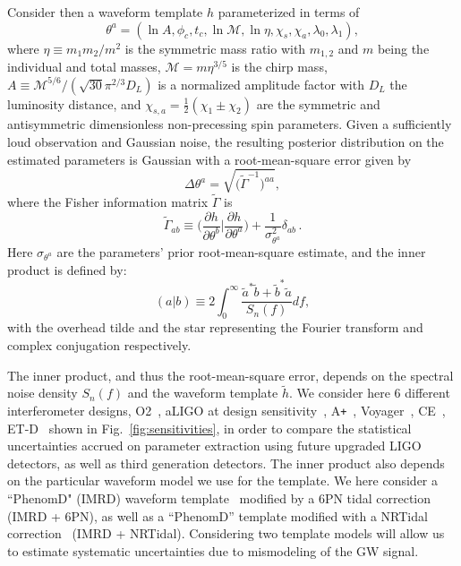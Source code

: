 \documentclass[prd,twocolumn,nofootinbib,superscriptaddress,amsmath,amssymb]{revtex4-1}
\begin{document}
Consider then a waveform template $h$ parameterized in terms of
\begin{equation}\label{eq:template}
\theta^a=(\ln{A},\phi_c,t_c,\ln{\mathcal{M}},\ln{\mathcal{\eta}},\chi_s,\chi_a,\lambda_0, \lambda_1),
\end{equation}
where $\eta \equiv m_1 m_2/m^2$ is the symmetric mass ratio with $m_{1,2}$ and $m$ being the individual and total masses, $\mathcal{M}=m \eta^{3/5}$ is the chirp mass, $A \equiv {\mathcal{M}^{5/6}}/({\sqrt{30}\pi^{2/3}D_L})$ is a normalized amplitude factor with $D_L$ the luminosity distance, and $\chi_{s,a}=\frac{1}{2}(\chi_1\pm\chi_2)$ are the symmetric and antisymmetric dimensionless non-precessing spin parameters. Given a sufficiently loud observation and Gaussian noise, the resulting posterior distribution on the estimated parameters is Gaussian with a root-mean-square error given by
\begin{equation}
\Delta \theta^a=\sqrt{\Big( \tilde{\Gamma}^{-1}\Big)^{aa}},
\end{equation}
where the Fisher information matrix $\tilde{\Gamma}$ is
\begin{equation}
\tilde{\Gamma}_{ab} \equiv \Big( \frac{\partial h}{\partial \theta^b} \Big| \frac{\partial h}{\partial \theta^a}\Big) + \frac{1}{\sigma_{\theta^a}^2} \delta_{ab}\,.
\end{equation}
Here $\sigma_{\theta^a}$ are the parameters' prior root-mean-square estimate, and the inner product is defined by:
\begin{equation}
(a|b) \equiv 2 \int^{\infty}_0\frac{\tilde{a}^*\tilde{b}+\tilde{b}^*\tilde{a}}{S_n(f)}df,
\end{equation}
with the overhead tilde and the star representing the Fourier transform and complex conjugation respectively. 

The inner product, and thus the root-mean-square error, depends on the spectral noise density $S_{n}(f)$ and the waveform template $\tilde{h}$. We consider here 6 different interferometer designs, O2~\cite{aLIGO}, aLIGO at design sensitivity~\cite{aLIGO}, A\texttt{+}~\cite{Ap_Voyager_CE}, Voyager~\cite{Ap_Voyager_CE}, CE~\cite{ET}, ET-D~\cite{Ap_Voyager_CE} shown in Fig.~\ref{fig:sensitivities}, in order to compare the statistical uncertainties accrued on parameter extraction using future upgraded LIGO detectors, as well as third generation detectors. The inner product also depends on the particular waveform model we use for the template. We here consider a ``PhenomD" (IMRD) waveform template~\cite{PhenomDI,PhenomDII} modified by a 6PN tidal correction~\cite{Wade:tidalCorrections} (IMRD + 6PN), as well as a ``PhenomD'' template modified with a NRTidal correction~\cite{Samajdar:NRTidal} (IMRD + NRTidal). Considering two template models will allow us to estimate systematic uncertainties due to mismodeling of the GW signal. 
\end{document}
